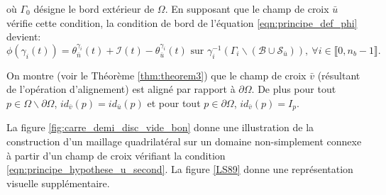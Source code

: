 où $\Gamma_0$ désigne le bord extérieur de $\Omega$. En supposant que le champ de croix $\bar{u}$ vérifie cette condition, la condition de bord de l'équation \eqref{eqn:principe_def_phi} devient:
$$
\phi(\gamma_i(t))=\theta_{\bar{n}}^{\gamma_i}(t)+\mathcal{I}(t)-\theta_{\bar{u}}^{\gamma_i}(t) \mbox{ sur } \gamma_i^{-1}(\Gamma_i\backslash(\mathcal{B}\cup\mathcal{S}_{\bar{u}})),~\forall i\in\llbracket 0, n_b-1\rrbracket.
$$
\begin{remark}
    On montre (voir le Théorème \ref{thm:theorem3}) que le champ de croix $\bar{v}$ (résultant de l'opération d'alignement) est aligné par rapport à $\partial\Omega$. De plus pour tout $p\in\Omega\backslash\partial\Omega$, $id_{\bar{v}}(p)=id_{\bar{u}}(p)$ et pour tout $p\in\partial\Omega$, $id_{\bar{v}}(p)=I_p$.
\end{remark}
La figure \ref{fig:carre_demi_disc_vide_bon} donne une illustration de la construction d'un maillage quadrilatéral sur un domaine non-simplement connexe à partir d'un champ de croix vérifiant la condition \ref{eqn:principe_hypothese_u_second}. La figure \ref{LS89} donne une représentation visuelle supplémentaire.


